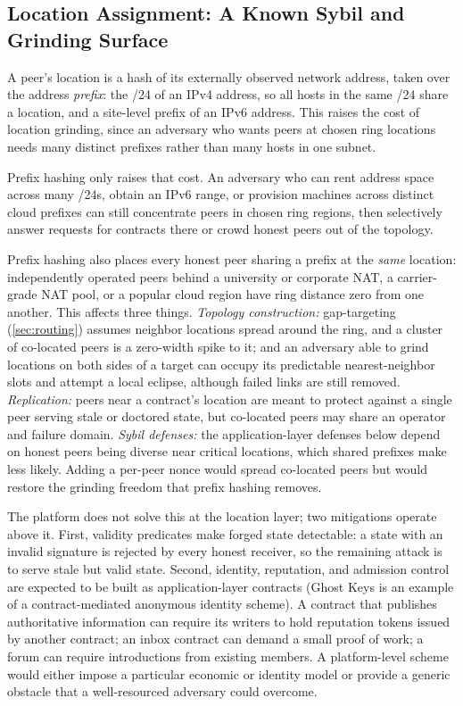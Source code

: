 \subsection{Location Assignment: A Known Sybil and Grinding Surface}

A peer's location is a hash of its externally observed network address, taken over the address \emph{prefix}: the /24 of an IPv4 address, so all hosts in the same /24 share a location, and a site-level prefix of an IPv6 address. This raises the cost of location grinding, since an adversary who wants peers at chosen ring locations needs many distinct prefixes rather than many hosts in one subnet.

Prefix hashing only raises that cost. An adversary who can rent address space across many /24s, obtain an IPv6 range, or provision machines across distinct cloud prefixes can still concentrate peers in chosen ring regions, then selectively answer requests for contracts there or crowd honest peers out of the topology.

Prefix hashing also places every honest peer sharing a prefix at the \emph{same} location: independently operated peers behind a university or corporate NAT, a carrier-grade NAT pool, or a popular cloud region have ring distance zero from one another. This affects three things. \emph{Topology construction:} gap-targeting (\cref{sec:routing}) assumes neighbor locations spread around the ring, and a cluster of co-located peers is a zero-width spike to it; and an adversary able to grind locations on both sides of a target can occupy its predictable nearest-neighbor slots and attempt a local eclipse, although failed links are still removed. \emph{Replication:} peers near a contract's location are meant to protect against a single peer serving stale or doctored state, but co-located peers may share an operator and failure domain. \emph{Sybil defenses:} the application-layer defenses below depend on honest peers being diverse near critical locations, which shared prefixes make less likely. Adding a per-peer nonce would spread co-located peers but would restore the grinding freedom that prefix hashing removes.

The platform does not solve this at the location layer; two mitigations operate above it. First, validity predicates make forged state detectable: a state with an invalid signature is rejected by every honest receiver, so the remaining attack is to serve stale but valid state. Second, identity, reputation, and admission control are expected to be built as application-layer contracts (Ghost Keys \citep{ghostkey} is an example of a contract-mediated anonymous identity scheme). A contract that publishes authoritative information can require its writers to hold reputation tokens issued by another contract; an inbox contract can demand a small proof of work; a forum can require introductions from existing members. A platform-level scheme would either impose a particular economic or identity model or provide a generic obstacle that a well-resourced adversary could overcome.

